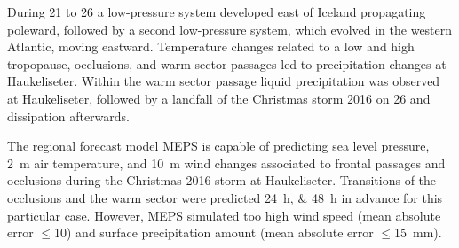\noindent
During \num{21} to \SI{26}{\dec} a low-pressure system developed east of Iceland propagating poleward, followed by a second low-pressure system, which evolved in the western Atlantic, moving eastward.
Temperature changes related to a low and high tropopause, occlusions, and warm sector passages led to precipitation changes %
at Haukeliseter. 
Within the warm sector passage liquid precipitation was observed at Haukeliseter, followed by a landfall of the Christmas storm 2016 on \SI{26}{\dec} and dissipation afterwards. 
\par\medskip
\noindent
The regional forecast model MEPS is capable of predicting sea level pressure, \SI{2}{\metre} air temperature, and \SI{10}{\metre} wind changes associated to frontal passages and occlusions during the Christmas 2016 storm at Haukeliseter. 
Transitions of the occlusions and the warm sector were predicted \SIlist{24;48}{\hour} in advance for this particular case.
However, MEPS simulated too high wind speed (mean absolute error $\le$\SI{10}{\mPs}) and surface precipitation amount (mean absolute error $\le$\SI{15}{\mm}).
\par\medskip
\noindent
